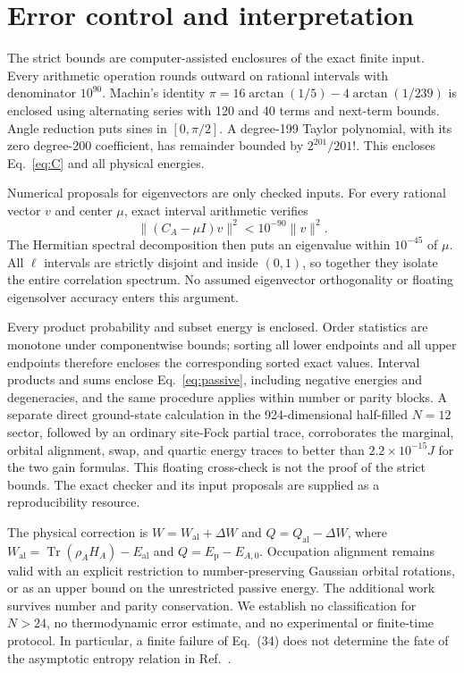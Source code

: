 \documentclass[aps,prb,reprint,amsmath,amssymb,longbibliography,floatfix]{revtex4-2}
\newcommand{\Tr}{\operatorname{Tr}}
\newcommand{\al}{\mathrm{al}}
\newcommand{\pa}{\mathrm{p}}
\begin{document}
\section{Error control and interpretation}
The strict bounds are computer-assisted enclosures of the exact finite
input. Every arithmetic operation rounds outward on rational intervals
with denominator $10^{90}$. Machin's identity
$\pi=16\arctan(1/5)-4\arctan(1/239)$ is enclosed using alternating
series with 120 and 40 terms and next-term bounds. Angle reduction puts
sines in $[0,\pi/2]$. A degree-199 Taylor polynomial, with its zero
degree-200 coefficient, has remainder bounded by $2^{201}/201!$.
This encloses Eq.~\eqref{eq:C} and all physical energies.

Numerical proposals for eigenvectors are only checked inputs. For every
rational vector $v$ and center $\mu$, exact interval arithmetic verifies
\begin{equation}
 \|(C_A-\mu I)v\|^2<10^{-90}\|v\|^2.
\end{equation}
The Hermitian spectral decomposition then puts an eigenvalue within
$10^{-45}$ of $\mu$. All $\ell$ intervals are strictly disjoint and inside
$(0,1)$, so together they isolate the entire correlation spectrum.
No assumed eigenvector orthogonality or floating eigensolver accuracy
enters this argument.

Every product probability and subset energy is enclosed. Order statistics
are monotone under componentwise bounds; sorting all lower endpoints and
all upper endpoints therefore encloses the corresponding sorted exact
values. Interval products and sums enclose Eq.~\eqref{eq:passive}, including
negative energies and degeneracies, and the same procedure applies within
number or parity blocks. A separate direct ground-state calculation in
the 924-dimensional half-filled $N=12$ sector, followed by an ordinary
site-Fock partial trace, corroborates the marginal, orbital alignment,
swap, and quartic energy traces to better than $2.2\times10^{-15}J$ for the
two gain formulas. This floating cross-check is not the proof of the
strict bounds. The exact checker and its input proposals are supplied
as a reproducibility resource.

The physical correction is
$W=W_{\al}+\Delta W$ and $Q=Q_{\al}-\Delta W$, where
$W_{\al}=\Tr(\rho_AH_A)-E_{\al}$ and $Q=E_{\pa}-E_{A,0}$.
Occupation alignment remains valid with an explicit restriction to
number-preserving Gaussian orbital rotations, or as an upper bound on
the unrestricted passive energy. The additional work survives
number and parity conservation. We establish no classification for
$N>24$, no thermodynamic error estimate, and no experimental or
finite-time protocol. In particular, a finite failure of Eq.~(34) does
not determine the fate of the asymptotic entropy relation in
Ref.~\cite{Mula2023}.
\end{document}
